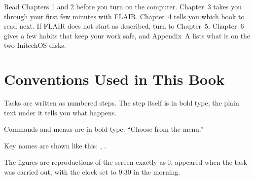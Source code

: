 Read Chapters 1 and 2 before you turn on the computer.  Chapter~3 takes you
through your first few minutes with FLAIR.  Chapter~4 tells you which book
to read next.  If FLAIR does not start as described, turn to Chapter~5.
Chapter~6 gives a few habits that keep your work safe, and Appendix~A
lists what is on the two InitechOS disks.

\section{Conventions Used in This Book}
Tasks are written as numbered steps.  The step itself is in
bold type; the plain text under it tells you what happens.

Commands and menus are in bold type: ``Choose
 from the  menu.''

Key names are shown like this: , .

The figures are reproductions of the screen exactly as
it appeared when the task was carried out, with the clock set to 9:30 in
the morning.
